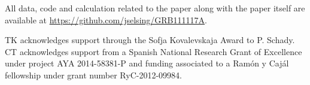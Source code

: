 \documentclass{aa}    %
\begin{document}
All data, code and calculation related to the paper along with the
paper itself are available at \url{https://github.com/jselsing/GRB111117A}.

\begin{acknowledgements}
TK acknowledges support through the Sofja Kovalevskaja Award to P. Schady. CT acknowledges support from a Spanish National Research Grant of Excellence under project AYA 2014-58381-P and funding associated to a Ramón y Cajál fellowship under grant number RyC-2012-09984.
\end{acknowledgements}




\newpage




\end{document}
